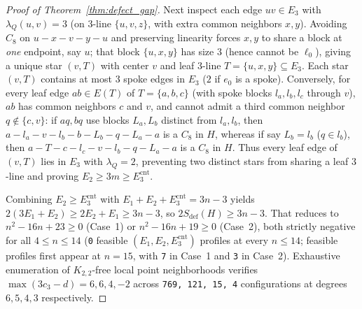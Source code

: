 \documentclass[11pt]{amsart}
\theoremstyle{definition}
\theoremstyle{remark}
\begin{document}
\begin{proof}[Proof of Theorem~\ref{thm:defect_gap}]
Next inspect each edge $uv \in E_3$ with $\lambda_Q(u,v) = 3$ (on $3$-line $\{u,v,z\}$, with extra common neighbors $x, y$). Avoiding $C_8$ on $u - x - v - y - u$ and preserving linearity forces $x, y$ to share a block at \emph{one} endpoint, say $u$; that block $\{u, x, y\}$ has size $3$ (hence cannot be $\ell_0$), giving a unique star $(v, T)$ with center $v$ and leaf $3$-line $T = \{u, x, y\} \subseteq E_3$. Each star $(v, T)$ contains at most $3$ spoke edges in $E_3$ ($2$ if $e_0$ is a spoke). Conversely, for every leaf edge $ab \in E(T)$ of $T = \{a, b, c\}$ (with spoke blocks $l_a, l_b, l_c$ through $v$), $ab$ has common neighbors $c$ and $v$, and cannot admit a third common neighbor $q \notin \{c, v\}$: if $aq, bq$ use blocks $L_a, L_b$ distinct from $l_a, l_b$, then $a - l_a - v - l_b - b - L_b - q - L_a - a$ is a $C_8$ in $H$, whereas if say $L_b = l_b$ ($q \in l_b$), then $a - T - c - l_c - v - l_b - q - L_a - a$ is a $C_8$ in $H$. Thus every leaf edge of $(v, T)$ lies in $E_3$ with $\lambda_Q = 2$, preventing two distinct stars from sharing a leaf $3$-line and proving $E_2 \ge 3m \ge E_3^{\mathrm{cnt}}$.

Combining $E_2 \ge E_3^{\mathrm{cnt}}$ with $E_1 + E_2 + E_3^{\mathrm{cnt}} = 3n - 3$ yields $2(3E_1 + E_2) \ge 2E_2 + E_1 \ge 3n - 3$, so $2 S_{\mathrm{def}}(H) \ge 3n - 3$. That reduces to $n^2 - 16n + 23 \ge 0$ (Case~1) or $n^2 - 16n + 19 \ge 0$ (Case~2), both strictly negative for all $4 \le n \le 14$ (\texttt{0} feasible $(E_1, E_2, E_3^{\mathrm{cnt}})$ profiles at every $n \le 14$; feasible profiles first appear at $n = 15$, with \texttt{7} in Case~1 and \texttt{3} in Case~2). Exhaustive enumeration of $K_{2,2}$-free local point neighborhoods verifies $\max(3c_3 - d) = 6, 6, 4, -2$ across \texttt{769, 121, 15, 4} configurations at degrees $6, 5, 4, 3$ respectively.
\end{proof}
\end{document}
